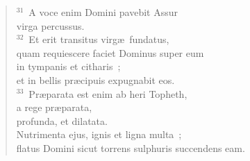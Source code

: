 \begin{verse}
${}^{31}$~A voce enim Domini pavebit Assur\\ virga percussus.\\
${}^{32}$~Et erit transitus virg\ae\ fundatus,\\ quam requiescere faciet Dominus super eum\\ in tympanis et citharis~;\\ et in bellis pr\ae cipuis expugnabit eos.\\
${}^{33}$~Pr\ae parata est enim ab heri Topheth,\\ a rege pr\ae parata,\\ profunda, et dilatata.\\ Nutrimenta ejus, ignis et ligna multa~;\\ flatus Domini sicut torrens sulphuris succendens eam.\end{verse}


